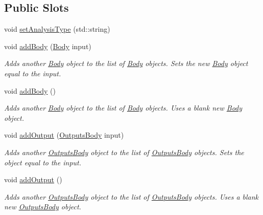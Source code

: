\subsection*{Public Slots}
\begin{DoxyCompactItemize}
\item 
void \hyperlink{classosea_1_1ofreq_1_1_system_a76c67d09ec93cb654c6fd49d00e12485}{set\-Analysis\-Type} (std\-::string)
\item 
void \hyperlink{classosea_1_1ofreq_1_1_system_a0e146c46e245b3222a77fbcf93901630}{add\-Body} (\hyperlink{classosea_1_1ofreq_1_1_body}{Body} input)
\begin{DoxyCompactList}\small\item\em Adds another \hyperlink{classosea_1_1ofreq_1_1_body}{Body} object to the list of \hyperlink{classosea_1_1ofreq_1_1_body}{Body} objects. Sets the new \hyperlink{classosea_1_1ofreq_1_1_body}{Body} object equal to the input. \end{DoxyCompactList}\item 
void \hyperlink{classosea_1_1ofreq_1_1_system_a31949bbe2fceb1df4ba99f9c9c9465cd}{add\-Body} ()
\begin{DoxyCompactList}\small\item\em Adds another \hyperlink{classosea_1_1ofreq_1_1_body}{Body} object to the list of \hyperlink{classosea_1_1ofreq_1_1_body}{Body} objects. Uses a blank new \hyperlink{classosea_1_1ofreq_1_1_body}{Body} object. \end{DoxyCompactList}\item 
void \hyperlink{classosea_1_1ofreq_1_1_system_a439bada214bf663084c15939a1793e02}{add\-Output} (\hyperlink{classosea_1_1ofreq_1_1_outputs_body}{Outputs\-Body} input)
\begin{DoxyCompactList}\small\item\em Adds another \hyperlink{classosea_1_1ofreq_1_1_outputs_body}{Outputs\-Body} object to the list of \hyperlink{classosea_1_1ofreq_1_1_outputs_body}{Outputs\-Body} objects. Sets the object equal to the input. \end{DoxyCompactList}\item 
void \hyperlink{classosea_1_1ofreq_1_1_system_a4f84d2819d8a095818cb08bc84fa92f9}{add\-Output} ()
\begin{DoxyCompactList}\small\item\em Adds another \hyperlink{classosea_1_1ofreq_1_1_outputs_body}{Outputs\-Body} object to the list of \hyperlink{classosea_1_1ofreq_1_1_outputs_body}{Outputs\-Body} objects. Uses a blank new \hyperlink{classosea_1_1ofreq_1_1_outputs_body}{Outputs\-Body} object. \end{DoxyCompactList}\item 

\end{DoxyCompactItemize}
